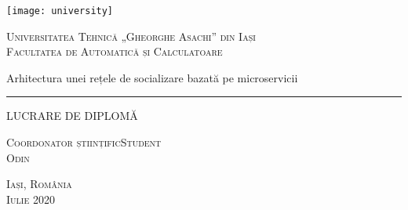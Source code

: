 \begin{titlepage}
	\begin{center}

		\texttt{[image: university]}

		\vspace{0.5cm}
		\LARGE \textsc{Universitatea Tehnică „Gheorghe Asachi” din Iași}
		\\
		\vspace{0.5cm}
		\Large \textsc{Facultatea de Automatică și Calculatoare}

		\vfill

		\Huge Arhitectura unei rețele de socializare bazată pe microservicii
		\rule{\textwidth}{1pt}
		\Large LUCRARE DE DIPLOMĂ

		\vfill

		\Large
		\textsc{Coordonator științific}\hfill \textsc{Student}
		\\
		\large
		\textsc{}\hfill \textsc{Odin}
	
		\vspace{1.5cm}
		\textsc{Iași, România}\\
		\textsc{Iulie 2020}

	\end{center}
\end{titlepage}
 
